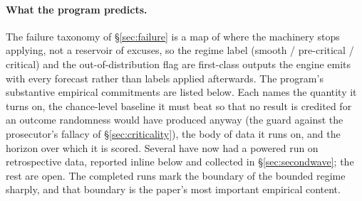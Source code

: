 \documentclass[11pt]{article}
\begin{document}
\paragraph{What the program predicts.} The failure taxonomy of \S\ref{sec:failure} is a map of where the machinery stops applying, not a reservoir of excuses, so the regime label (smooth / pre-critical / critical) and the out-of-distribution flag are first-class outputs the engine emits with every forecast rather than labels applied afterwards. The program's substantive empirical commitments are listed below. Each names the quantity it turns on, the chance-level baseline it must beat so that no result is credited for an outcome randomness would have produced anyway (the guard against the prosecutor's fallacy of \S\ref{sec:criticality}), the body of data it runs on, and the horizon over which it is scored. Several have now had a powered run on retrospective data, reported inline below and collected in \S\ref{sec:secondwave}; the rest are open. The completed runs mark the boundary of the bounded regime sharply, and that boundary is the paper's most important empirical content.
\end{document}
